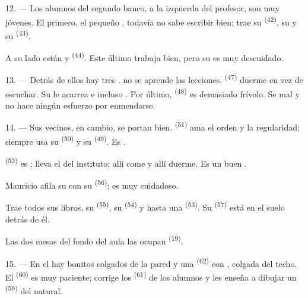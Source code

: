 12. --- Los alumnos del segundo banco, a la izquierda del profesor, son
muy jóvenes. El primero, el pequeño , todavía no sabe
escribir bien; trae su  \textsuperscript{(42)}, su
 y su  \textsuperscript{(43)}.

A su lado están  y  \textsuperscript{(44)}. Este
último trabaja bien, pero su  es muy descuidado.

13. --- Detrás de ellos hay tres .  no se
aprende las lecciones.  \textsuperscript{(47)} duerme en vez de
escuchar. Su  le acarrea  e incluso
. Por último,  \textsuperscript{(48)} es demasiado
frívolo. Se  mal y no hace ningún esfuerzo por enmendarse.

14. --- Sus vecinos, en cambio, se portan bien. 
\textsuperscript{(51)} ama el orden y la regularidad; siempre usa su 
\textsuperscript{(50)} y su  \textsuperscript{(49)}. Es .

 \textsuperscript{(52)} es ; lleva el 
del instituto; allí come y allí duerme. Es un buen .

Mauricio afila su  con su  \textsuperscript{(56)}; es muy
cuidadoso.

Trae todos sus libros, su  \textsuperscript{(55)}, su
 \textsuperscript{(54)} y hasta una  \textsuperscript{(53)}. Su  \textsuperscript{(57)}
está en el suelo detrás de él.

Las dos mesas del fondo del aula las ocupan 
\textsuperscript{(19)}.

\VUsaut{4.6mm}
\VUsaut{3.4mm}

15. --- En el  hay bonitos  colgados de
la pared y una  \textsuperscript{(62)} con ,
colgada del techo. El  \textsuperscript{(60)} es muy paciente;
corrige los  \textsuperscript{(61)} de los alumnos y les enseña a
dibujar un  \textsuperscript{(59)} del natural.

